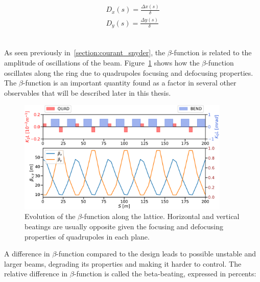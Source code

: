 \begin{equation}
    \begin{aligned}
    D_x(s) = \frac{\Delta x(s)}{\delta} \\
    D_y(s) = \frac{\Delta y(s)}{\delta} \\
    \end{aligned}
    \label{eq:coordinate_systems:dispersion}
\end{equation}



\subsection{}

As seen previously in~\ref{section:courant_snyder}, the $\beta$-function is related to the amplitude
of oscillations of the beam. Figure~\ref{fig:beam_optics:beta} shows how the $\beta$-function
oscillates along the ring due to quadrupoles focusing and defocusing properties.
The $\beta$-function is an important quantity found as a factor in several other observables that
will be described later in this thesis.


\begin{figure}[H]
    \centering
    \includegraphics[width=0.9\textwidth]{images/beta_function.pdf}
    \caption{Evolution of the $\beta$-function along the lattice. Horizontal and vertical beatings
    are usually opposite given the focusing and defocusing properties of quadrupoles in each plane.}
    \label{fig:beam_optics:beta}
\end{figure}

A difference in $\beta$-function compared to the design leads to possible unstable and larger beams,
degrading its properties and making it harder to control. The relative difference in
$\beta$-function is called the beta-beating, expressed in percents: 

